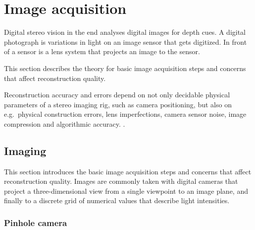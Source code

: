 


\section{Image acquisition}


Digital stereo vision in the end analyses digital images for depth cues.
A digital photograph is variations in light on an image sensor that gets digitized.
In front of a sensor is a lens system that projects an image to the sensor.

This section describes the theory for basic image acquisition steps and concerns that affect reconstruction quality.


Reconstruction accuracy and errors depend on not only decidable physical parameters of a stereo imaging rig, such as camera positioning, but also on e.g.~physical construction errors, lens imperfections, camera sensor noise, image compression and algorithmic accuracy. \cite{hollsten2013imagequality, kyto2011method,rieke2009evaluation}.

\subsection{Imaging} \label{sec:imaging} %

This section introduces the basic image acquisition steps and concerns that affect reconstruction quality.
Images are commonly taken with digital cameras that project a three-dimensional view from a single viewpoint to an image plane, and finally to a discrete grid of numerical values that describe light intensities.


\subsubsection{Pinhole camera} \label{sec:pinhole} %

